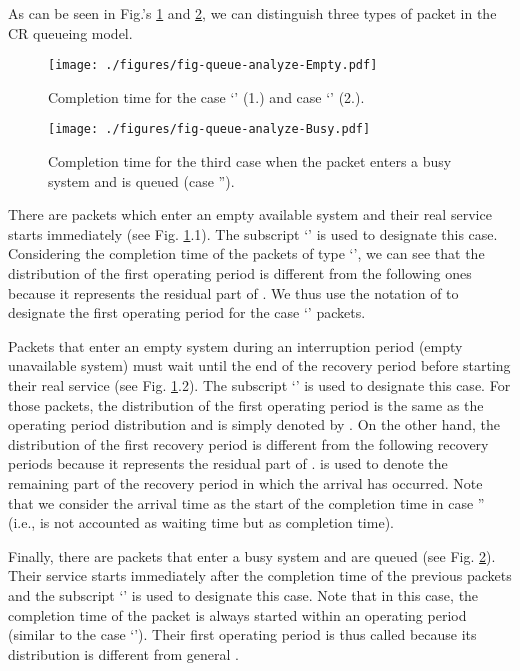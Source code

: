 \documentclass[11pt,journal,oneside,onecolumn,draftclsnofoot]{IEEEtran}
\begin{document}
As can be seen in Fig.'s \ref{fig-queue-analyze-Empty} and \ref{fig-queue-analyze-Busy},  we can distinguish three types of packet in the CR queueing model. 
\begin{figure}\texttt{[image: ./figures/fig-queue-analyze-Empty.pdf]}\caption{Completion time for the case `' (1.) and  case `' (2.).}\label{fig-queue-analyze-Empty}\vspace{-0.29cm}
\end{figure}
\begin{figure}\texttt{[image: ./figures/fig-queue-analyze-Busy.pdf]}\caption{Completion time for the third case when the packet enters a busy system and is queued (case '').}\label{fig-queue-analyze-Busy}\end{figure}
There are packets which enter an empty available system and their real service starts immediately (see Fig. \ref{fig-queue-analyze-Empty}.1). The subscript `' is used to designate this case. Considering the completion time of the packets of type `', we can see that the distribution of the first operating period is different from the following ones because it represents the residual part of . We thus use the notation of  to designate the first operating period for the case `' packets. 

Packets that enter an empty system during an interruption period (empty unavailable system) must wait until the end of the recovery period before starting their real service (see Fig. \ref{fig-queue-analyze-Empty}.2). The subscript `' is used to designate this case. For those packets, the distribution of the first operating period is the same as the operating period distribution and is simply denoted by . On the other hand, the distribution of the first recovery period is different from the following recovery periods because it represents the residual part of .  is used to denote the remaining part of the recovery period in which the arrival has occurred. Note that we consider the arrival time as the start of the completion time in  case '' (i.e.,  is not accounted as waiting time but as completion time). 

Finally, there are packets that enter a busy system and are queued (see Fig. \ref{fig-queue-analyze-Busy}). Their service starts immediately after the completion time of the previous packets and the subscript `' is used to designate this case. Note that in this case, the completion time of the packet is always started within an operating period (similar to the case `'). Their first operating period is thus called  because its distribution is different from general .
\end{document}
